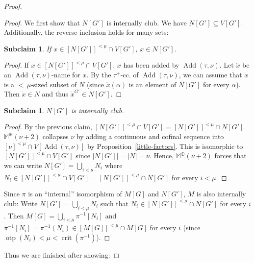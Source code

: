 \documentclass[a4paper]{amsart}
\theoremstyle{definition}
\theoremstyle{remark}
\theoremstyle{plain}
\newtheorem{mysclai}[mydef]{Subclaim}
\numberwithin{mydef}{section}
\DeclareMathOperator{\crit}{crit}
\DeclareMathOperator{\otp}{otp}
\DeclareMathOperator{\Add}{Add}
\newcommand{\dM}{\mathbb{M}}
\begin{document}
\begin{proof}
		\begin{proof}
			We first show that $N[G']$ is internally club. We have $N[G']\subseteq V[G']$. Additionally, the reverse inclusion holds for many sets:
			\begin{mysclai}
				If $x\in [N[G']]^{<\mu}\cap V[G']$, $x\in N[G']$.
			\end{mysclai}
			\begin{proof}
				If $x\in [N[G']]^{<\mu}\cap V[G']$, $x$ has been added by $\Add(\tau,\nu)$. Let $\dot{x}$ be an $\Add(\tau,\nu)$-name for $x$. By the $\tau^+$-cc. of $\Add(\tau,\nu)$, we can assume that $\dot{x}$ is a ${<}\,\mu$-sized subset of $N$ (since $\dot{x}(\alpha)$ is an element of $N[G']$ for every $\alpha$). Then $\dot{x}\in N$ and thus $\dot{x}^{G'}\in N[G']$.
			\end{proof}
			\begin{mysclai}
				$N[G']$ is internally club.
			\end{mysclai}
			\begin{proof}
				By the previous claim, $[N[G']]^{<\mu}\cap V[G']=[N[G']]^{<\mu}\cap N[G']$. $\dM^\oplus(\nu+2)$ collapses $\nu$ by adding a continuous and cofinal sequence into $[\nu]^{<\mu}\cap V[\Add(\tau,\nu)]$ by Proposition~\autoref{little-factors}. This is isomorphic to $[N[G']]^{<\mu}\cap V[G']$ since $|N[G']|=|N|=\nu$. Hence, $\dM^\oplus(\nu+2)$ forces that we can write $N[G']=\bigcup_{i<\mu}N_i$ where $N_i\in [N[G']]^{<\mu}\cap V[G']=[N[G']]^{<\mu}\cap N[G']$ for every $i<\mu$.
			\end{proof}
			Since $\pi$ is an ``internal'' isomorphism of $M[G]$ and $N[G']$, $M$ is also internally club: Write $N[G']=\bigcup_{i<\mu}N_i$ such that $N_i\in [N[G']]^{<\mu}\cap N[G']$ for every $i$. Then $M[G]=\bigcup_{i<\mu}\pi^{-1}[N_i]$ and $\pi^{-1}[N_i]=\pi^{-1}(N_i)\in [M[G]]^{<\mu}\cap M[G]$ for every $i$ (since $\otp(N_i)<\mu<\crit(\pi^{-1})$).
		\end{proof}
		
		Thus we are finished after showing:
		

\end{proof}
\end{document}
